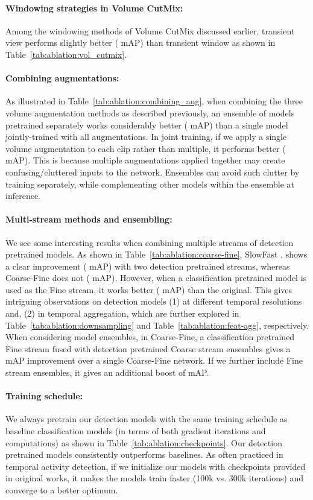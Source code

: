 \documentclass[letterpaper]{article} \usepackage{aaai23}  \usepackage{times}  \usepackage{helvet}  \usepackage{courier}  \usepackage[hyphens]{url}  \usepackage{graphicx} \urlstyle{rm} \def\UrlFont{\rm}  \usepackage{natbib}  \usepackage{caption} \frenchspacing  \setlength{\pdfpagewidth}{8.5in}  \setlength{\pdfpageheight}{11in}  \usepackage{algorithm}
\newcommand{\tref}[1]{Table~\ref{#1}}
\newcommand{\ch}{}
\begin{document}
\paragraph{Windowing strategies in Volume CutMix:} Among the windowing methods of Volume CutMix discussed earlier, transient view performs slightly better ( mAP) than transient window as shown in \tref{tab:ablation:vol_cutmix}.

\paragraph{Combining augmentations:} As illustrated in \tref{tab:ablation:combining_aug}, when combining the three volume augmentation methods as described previously, an ensemble of models pretrained separately works considerably better ( mAP) than a single model jointly-trained with all augmentations. \ch{In joint training, if we apply a single volume augmentation to each clip rather than multiple, it performs better ( mAP).} This is because multiple augmentations applied together may create confusing/cluttered inputs to the network. Ensembles can avoid such clutter by training separately, while complementing other models within the ensemble at inference.

\paragraph{Multi-stream methods and ensembling:} We see some interesting results when combining multiple streams of detection pretrained models. As shown in \tref{tab:ablation:coarse-fine}, SlowFast \cite{feichtenhofer2019slowfast}, shows a clear improvement ( mAP) with two detection pretrained streams, whereas Coarse-Fine \cite{kahatapitiya2021coarse} does not ( mAP). However, when a classification pretrained model is used as the Fine stream, it works better ( mAP) than the original. This gives intriguing observations on detection models (1) at different temporal resolutions and, (2) in temporal aggregation, which are further explored in \tref{tab:ablation:downsampling} and \tref{tab:ablation:feat-agg}, respectively. When considering model ensembles, in Coarse-Fine, a classification pretrained Fine stream fused with detection pretrained Coarse stream ensembles gives a  mAP improvement over a single Coarse-Fine network. If we further include Fine stream ensembles, it gives an additional boost of  mAP.

\paragraph{Training schedule:} \ch{We always pretrain our detection models with the same training schedule as baseline classification models (in terms of both gradient iterations and computations) as shown in \tref{tab:ablation:checkpoints}. Our detection pretrained models consistently outperforms baselines. As often practiced in temporal activity detection, if we initialize our models with checkpoints provided in original works, it makes the models train faster (100k vs. 300k iterations) and converge to a better optimum.}
\end{document}
